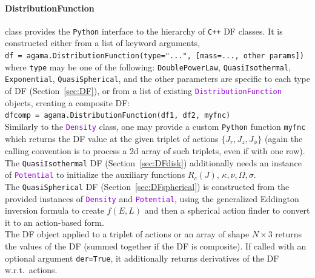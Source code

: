 \documentclass[12pt]{article}
\newcommand{\Cpp}  {\texttt{C++}\xspace}
\newcommand{\Python}{\texttt{Python}\xspace}
\newcommand{\ttt}[1]{\textcolor{darkviolet}{\texttt{#1}}}
\newcommand{\ppp}[1]{\textcolor{darkolive} {\texttt{#1}}}
\let\oldparagraph\paragraph
\renewcommand{\paragraph}[1]{\vspace{-2mm}\oldparagraph{#1}}
\begin{document}
\paragraph{DistributionFunction} class provides the \Python interface to the hierarchy of \Cpp DF classes. It is constructed either from a list of keyword arguments,\\[1mm]
\texttt{df = agama.DistributionFunction(type="...", [mass=..., other params])}\\[1mm]
where \ppp{type} may be one of the following: \ppp{DoublePowerLaw}, \ppp{QuasiIsothermal}, \ppp{Exponential}, \ppp{QuasiSpherical}, and the other parameters are specific to each type of DF (Section~\ref{sec:DF}),
or from a list of existing \ttt{DistributionFunction} objects, creating a composite DF:\\[1mm]
\texttt{dfcomp = agama.DistributionFunction(df1, df2, myfnc)}
\\[2mm]
Similarly to the \ttt{Density} class, one may provide a custom \Python function \texttt{myfnc} which returns the DF value at the given triplet of actions $\{J_r,J_z,J_\phi\}$ (again the calling convention is to process a 2d array of such triplets, even if with one row).
\\[2mm]
The \ppp{QuasiIsothermal} DF (Section~\ref{sec:DFdisk}) additionally needs an instance of \ttt{Potential} to initialize the auxiliary functions $R_c(J)$, $\kappa,\nu,\Omega,\sigma$.
\\[2mm]
The \ppp{QuasiSpherical} DF (Section~\ref{sec:DFspherical}) is constructed from the provided instances of \ttt{Density} and \ttt{Potential}, using the generalized Eddington inversion formula to create $f(E,L)$ and then a spherical action finder to convert it to an action-based form.\\[2mm]
The DF object applied to a triplet of actions or an array of shape $N\times3$ returns the values of the DF (summed together if the DF is composite). If called with an optional argument \texttt{der=True}, it additionally returns derivatives of the DF w.r.t.\ actions.
\end{document}
